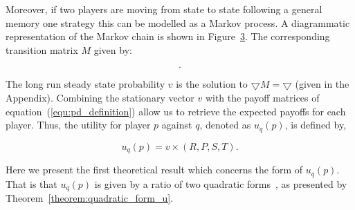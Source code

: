 \documentclass[10pt]{article}
\begin{document}
\begin{figure}
    \centering
    \begin{subfigure}{0.45\textwidth}
        \centering
        
        \label{fig:diagram_mem_one}
    \end{subfigure}
    \begin{subfigure}{0.45\textwidth}
        \centering
        
        \label{fig:markov_chain}
    \end{subfigure}
\end{figure}

Moreover, if two players are moving from state to state following a general
memory one strategy this can be modelled as a Markov process. A diagrammatic
representation of the Markov chain is shown in Figure~\ref{fig:markov_chain}.
The corresponding transition matrix \(M\) given by:

\begin{equation}\label{eq:m_matrix}
    .
\end{equation}

The long run steady state probability \(v\) is the solution to \(\bigtriangledown M = \bigtriangledown\)
(given in the Appendix). %
Combining the stationary vector \(v\) with the payoff matrices of equation~(\ref{equ:pd_definition})
allow us to retrieve the expected payoffs for each player. Thus, the utility for
player \(p\) against \(q\), denoted as \(u_q(p)\), is defined by,

\begin{equation}\label{eq:press_dyson_utility}
    u_q(p) = v \times (R, P, S, T).
\end{equation}

Here we present the first theoretical result which concerns the form of \(u_q(p)\).
That is that \(u_q(p)\) is given by a ratio of two quadratic forms~\cite{kepner2011},
as presented by Theorem~\ref{theorem:quadratic_form_u}.
\end{document}
